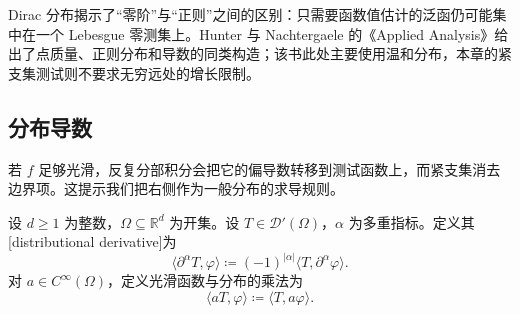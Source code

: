 Dirac 分布揭示了“零阶”与“正则”之间的区别：只需要函数值估计的泛函仍可能集中在一个 Lebesgue 零测集上。Hunter 与 Nachtergaele 的《Applied Analysis》\cite[Sections 11.2--11.3, pp. 291--296]{Hunter2001Applied}给出了点质量、正则分布和导数的同类构造；该书此处主要使用温和分布，本章的紧支集测试则不要求无穷远处的增长限制。

\subsection{分布导数}
\label{b1:subsec:200204}

若 \(f\) 足够光滑，反复分部积分会把它的偏导数转移到测试函数上，而紧支集消去边界项。这提示我们把右侧作为一般分布的求导规则。

\begin{definition}\label{b1:def:distributional-derivative}
设 \(d\geq1\) 为整数，\(\Omega\subseteq\mathbb R^d\) 为开集。设 \(T\in\mathcal D'(\Omega)\)，\(\alpha\) 为多重指标。定义其[distributional derivative]为
\begin{equation}\label{b1:eq:distributional-derivative}
 \langle\partial^\alpha T,\varphi\rangle
 \coloneqq(-1)^{|\alpha|}\langle T,\partial^\alpha\varphi\rangle.
\end{equation}
对 \(a\in C^\infty(\Omega)\)，定义光滑函数与分布的乘法为
\[
 \langle aT,\varphi\rangle\coloneqq\langle T,a\varphi\rangle.
\]
\end{definition}

